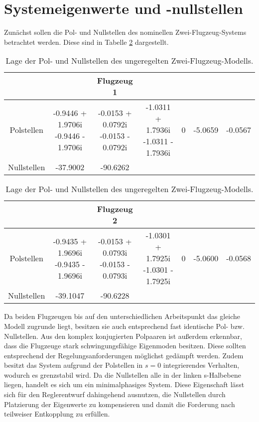 \section{Systemeigenwerte und -nullstellen}
Zunächst sollen die Pol- und Nullstellen des nominellen Zwei-Flugzeug-Systems betrachtet werden. Diese sind in Tabelle \ref{tab:pz_uncontrolled} dargestellt.
\begin{table}[h]
\begin{center}
\begin{tabular}{||c c c c c c c||} 
	\hline
	 & & Flugzeug 1& & & &\\ [0.5ex] 
	\hline\hline
	 Polstellen & \makecell{-0.9446 + 1.9706i \\ -0.9446 - 1.9706i} & \makecell{-0.0153 + 0.0792i \\ -0.0153 - 0.0792i} & \makecell{-1.0311 + 1.7936i \\ -1.0311 - 1.7936i} & 0 & -5.0659 & -0.0567\\ [1ex]
	 Nullstellen & -37.9002 & -90.6262 & & & &\\ [1ex]
	\hline\hline
\end{tabular}
\begin{tabular}{||c c c c c c c||} 
	& & Flugzeug 2& & & &\\ [0.5ex] 
	\hline\hline
	Polstellen & \makecell{-0.9435 + 1.9696i\\-0.9435 - 1.9696i} & \makecell{-0.0153 + 0.0793i\\-0.0153 - 0.0793i} & \makecell{-1.0301 + 1.7925i\\-1.0301 - 1.7925i} & 0 & -5.0600 & -0.0568\\ [1ex]
	Nullstellen & -39.1047 & -90.6228 & & & &\\ [1ex]
	\hline
\end{tabular}
\caption{\label{tab:pz_uncontrolled} Lage der Pol- und Nullstellen des ungeregelten Zwei-Flugzeug-Modells.}
\end{center}
\end{table}
Da beiden Flugzeugen bis auf den unterschiedlichen Arbeitspunkt das gleiche Modell zugrunde liegt, besitzen sie auch entsprechend fast identische Pol- bzw. Nullstellen. Aus den komplex konjugierten Polpaaren ist außerdem erkennbar, dass die Flugzeuge stark schwingungsfähige Eigenmoden besitzen. Diese sollten entsprechend der Regelungsanforderungen möglichst gedämpft werden. Zudem besitzt das System aufgrund der Polstellen in $s=0$ integrierendes Verhalten, wodurch es grenzstabil wird. Da die Nullstellen alle in der linken s-Halbebene liegen, handelt es sich um ein minimalphasiges System. Diese Eigenschaft lässt sich für den Reglerentwurf dahingehend ausnutzen, die Nullstellen durch Platzierung der Eigenwerte zu kompensieren und damit die Forderung nach teilweiser Entkopplung zu erfüllen. 

